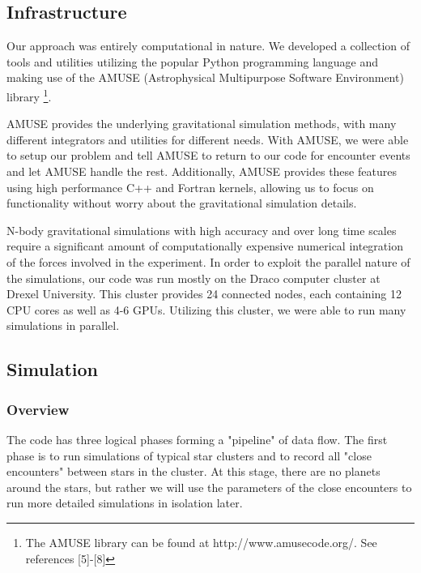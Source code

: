 \documentclass[12pt]{article}
\begin{document}
    \subsection{Infrastructure}

    Our approach was entirely computational in nature. We developed a collection of tools
    and utilities utilizing the popular Python programming language and making use
    of the AMUSE (Astrophysical Multipurpose Software Environment) library \footnote{The AMUSE library can be found at http://www.amusecode.org/. See references [5]-[8]}. 

    AMUSE provides the underlying gravitational simulation methods, with many different
    integrators and utilities for different needs. With AMUSE, we were able to 
    setup our problem and tell AMUSE to return to our code for encounter events and
    let AMUSE handle the rest. Additionally, AMUSE provides these features using high
    performance C++ and Fortran kernels, allowing us to focus on functionality without
    worry about the gravitational simulation details.

    N-body gravitational simulations with high accuracy and over long time scales require
    a significant amount of computationally expensive numerical integration of the 
    forces involved in the experiment. In order to exploit the parallel nature of 
    the simulations, our code was run mostly on the Draco computer 
    cluster at Drexel University. This cluster provides 24 connected nodes, each containing
    12 CPU cores as well as 4-6 GPUs. Utilizing this cluster, we were able to run many simulations in parallel.

    \subsection{Simulation}

    \subsubsection{Overview}

    The code has three logical phases forming a "pipeline" of data flow. 
    The first phase is to run simulations of typical
    star clusters and to record all "close encounters" between stars in the cluster.
    At this stage, there are no planets around the stars, but rather we will use the
    parameters of the close encounters to run more detailed simulations in isolation
    later.
\end{document}
